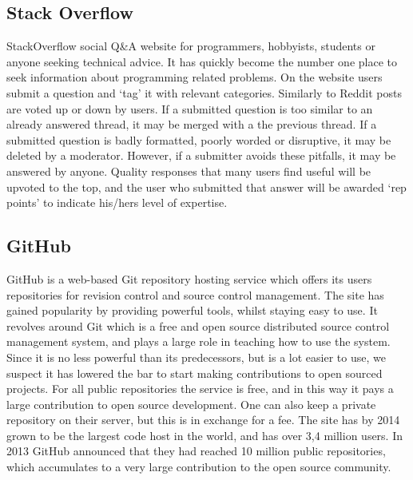 \documentclass[a4paper,11pt]{article} %
\begin{document}
\subsection{Stack Overflow}

StackOverflow social Q\&A website for programmers, hobbyists, students or anyone
seeking technical advice. It has quickly become the number one
place to seek information about programming related problems. On the website
users submit a question and ‘tag' it with relevant categories.  Similarly
to Reddit posts are voted up or down by users. If a submitted question is
too similar to an already answered thread, it may be merged with a the
previous thread. If a submitted question is badly formatted, poorly worded
or disruptive, it may be deleted by a moderator.  However, if a submitter
avoids these pitfalls, it may be answered by anyone. Quality responses that
many users find useful will be upvoted to the top, and the user who
submitted that answer will be awarded ‘rep points’ to indicate his/hers
level of expertise.


\subsection{GitHub}

GitHub is a web-based Git repository hosting service which offers its users
repositories for revision control and source control management. The site
has gained popularity by providing powerful tools, whilst staying easy to
use. It revolves around Git which is a free and open source distributed
source control management system, and plays a large role in teaching how to
use the system. Since it is no less powerful than its predecessors, but is a
lot easier to use, we suspect it has lowered the bar to start making
contributions to open sourced projects. For all public repositories the
service is free, and in this way it pays a large contribution to open source
development. One can also keep a private repository on their server, but
this is in exchange for a fee. The site has by 2014 grown to be the largest
code host in the world, and has over 3,4 million users. In 2013 GitHub
announced that they had reached 10 million public repositories, which
accumulates to a very large contribution to the open source community.
\end{document}

